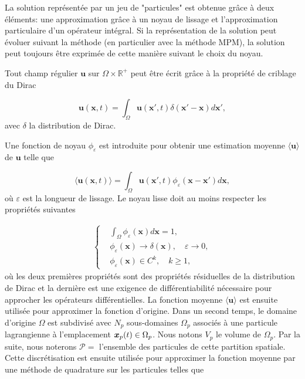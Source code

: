 La solution représentée par un jeu de "particules" est obtenue grâce à deux éléments: une approximation grâce à un noyau de lissage et l'approximation particulaire d'un opérateur intégral. Si la représentation de la solution peut évoluer suivant la méthode (en particulier avec la méthode MPM), la solution peut toujours être exprimée de cette manière suivant le choix du noyau.

Tout champ régulier $\bm{u}$ sur $\Omega \times \mathbb R^+$ peut être écrit grâce à la propriété de criblage du Dirac

\begin{equation*}
    \bm{u}(\bm{x}, t) = \int_{\Omega} \bm{u}(\bm{x}', t) \delta(\bm{x}' - \bm{x})  d\bm{x}',
\end{equation*}avec $\delta$ la distribution de Dirac.

Une fonction de noyau $\phi_\varepsilon$ est introduite pour obtenir une estimation moyenne $\langle \bm{u} \rangle$ de $\bm{u}$ telle que

\begin{equation*}
    \langle \bm{u}(\bm{x}, t) \rangle = \int_{\Omega} \bm{u}(\bm{x}', t) \phi_\varepsilon(\bm{x}-\bm{x}') d\bm{x},
\end{equation*}où $\varepsilon$ est la longueur de lissage. Le noyau lisse doit au moins respecter les propriétés suivantes

\begin{gather*}
    \left\{\begin{aligned}
         & \int_{\Omega} \phi_\varepsilon(\bm{x}) d\bm{x} = 1,                  \\
         & \phi_\varepsilon(\bm{x}) \to \delta(\bm x), \quad \varepsilon \to 0, \\
         & \phi_\varepsilon(\bm{x}) \in C^k,  \quad k \geq 1,
    \end{aligned} \right.
\end{gather*}où les deux premières propriétés sont des propriétés résiduelles de la distribution de Dirac et la dernière est une exigence de différentiabilité nécessaire pour approcher les opérateurs différentielles. La fonction moyenne $\langle \bm{u} \rangle$ est ensuite utilisée pour approximer la fonction d'origine. Dans un second temps, le domaine d'origine $\Omega$ est subdivisé avec $N_p$ sous-domaines $\Omega_p$ associés à une particule lagrangienne à l'emplacement $\bm{x}_p(t) \in \Omega_p$. Nous notons $V_p$ le volume de $\Omega_p$. Par la suite, nous noterons $\mathcal P = $ l'ensemble des particules de cette partition spatiale. Cette discrétisation est ensuite utilisée pour approximer la fonction moyenne par une méthode de quadrature sur les particules telles que


